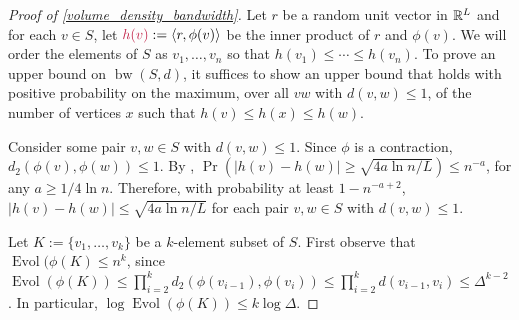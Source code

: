 \documentclass{patmorin}
\makeatletter
\renewcommand{\ge}{\geqslant}
\renewcommand{\le}{\leqslant}
\def\mathcolor#1#{\@mathcolor{#1}}
\def\@mathcolor#1#2#3{%
  \protect\leavevmode
  \begingroup
    \color#1{#2}#3%
  \endgroup
}
\newcommand{\mathdefin}[1]{\mathcolor{brightmaroon}{#1}}
\DeclareMathOperator{\bw}{bw}
\DeclareMathOperator{\evol}{Evol}
\makeatother
\begin{document}
\begin{proof}[Proof of \cref{volume_density_bandwidth}]
  Let $r$ be a random unit vector in $\mathbb{R}^L$ and for each $v\in S$, let $\mathdefin{h(v)}:=\langle r,\phi(v)\rangle$ be the inner product of $r$ and $\phi(v)$.  We will order the elements of $S$ as $v_1,\ldots,v_n$ so that $h(v_1)\le \cdots \le h(v_n)$.  To prove an upper bound on $\bw(S,d)$, it suffices to show an upper bound that holds with positive probability on the maximum, over all $vw$ with $d(v,w)\le 1$, of the number of vertices $x$ such that $h(v)\le h(x)\le h(w)$.

  Consider some pair $v,w\in S$ with $d(v,w)\le 1$. Since $\phi$ is a contraction, $d_2(\phi(v),\phi(w))\le 1$.  By \cite[Proposition~7]{feige:approximating}, $\Pr(|h(v)-h(w)|\ge \sqrt{4a\ln n/L}) \le n^{-a}$, for any $a\ge 1/4\ln n$. Therefore, with probability at least $1-n^{-a+2}$, $|h(v)-h(w)|\le \sqrt{4a\ln n/L}$ for each pair $v,w\in S$ with $d(v,w)\le 1$.

  Let  $K:=\{v_1,\ldots,v_k\}$ be a $k$-element subset of $S$. First observe that $\evol(\phi(K)\le n^k$, since $\evol(\phi(K))\le\prod_{i=2}^k d_2(\phi(v_{i-1}),\phi(v_i))\le \prod_{i=2}^k d(v_{i-1},v_i)\le \Delta^{k-2}$.  In particular, $\log\evol(\phi(K))\le k\log \Delta$.


\end{proof}
\end{document}

